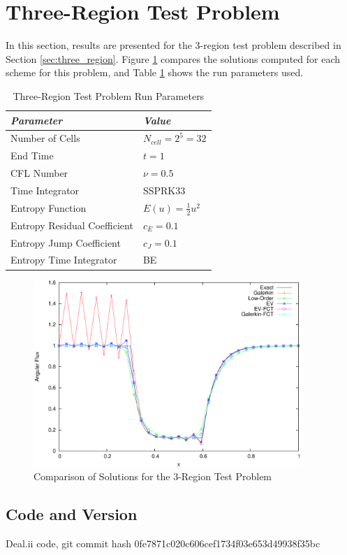 \section{Three-Region Test Problem}

In this section, results are presented for the 3-region test
problem described in Section \ref{sec:three_region}.
Figure \ref{fig:three_region} compares the solutions computed
for each scheme for this problem, and
Table \ref{tab:three_region_run_parameters} shows the run parameters used.
\begin{table}[h]\caption{Three-Region Test Problem Run Parameters}
\label{tab:three_region_run_parameters}
\centering
\begin{tabular}{l l}\toprule
\emph{Parameter} & \emph{Value}\\\midrule
Number of Cells & $N_{cell} = 2^5 = 32$\\
End Time & $t = 1$\\
CFL Number & $\nu = 0.5$\\
Time Integrator & SSPRK33\\\midrule
Entropy Function & $E(u) = \frac{1}{2}u^2$\\
Entropy Residual Coefficient & $c_E = 0.1$\\
Entropy Jump Coefficient & $c_J = 0.1$\\
Entropy Time Integrator & BE\\
\bottomrule\end{tabular}
\end{table}
\begin{figure}[h]
   \centering
   \includegraphics[width=0.9\textwidth]{three_region/three_region.pdf}
   \caption{Comparison of Solutions for the 3-Region Test Problem}
   \label{fig:three_region}
\end{figure}
\subsection{Code and Version}
Deal.ii code, git commit hash 0fe7871c020c606cef1734f03e653d49938f35bc
